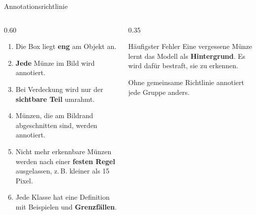 \begin{frame}{Annotationsrichtlinie}
\footnotesize
{}
\begin{columns}
\begin{column}{0.60\textwidth}
\begin{enumerate}
  \item Die Box liegt \textbf{eng} am Objekt an.
  \item \textbf{Jede} Münze im Bild wird annotiert.
  \item Bei Verdeckung wird nur der \textbf{sichtbare Teil} umrahmt.
  \item Münzen, die am Bildrand abgeschnitten sind, werden annotiert.
  \item Nicht mehr erkennbare Münzen werden nach einer \textbf{festen Regel} ausgelassen, z.\,B. kleiner als 15 Pixel.
  \item Jede Klasse hat eine Definition mit Beispielen und \textbf{Grenzfällen}.
\end{enumerate}
\end{column}
\begin{column}{0.35\textwidth}
\begin{blockC3}{Häufigster Fehler}
Eine vergessene Münze lernt das Modell als \textbf{Hintergrund}. Es wird dafür bestraft, sie zu erkennen.
\end{blockC3}
\vspace{0.5em}
Ohne gemeinsame Richtlinie annotiert jede Gruppe anders.
\end{column}
\end{columns}
\end{frame}
